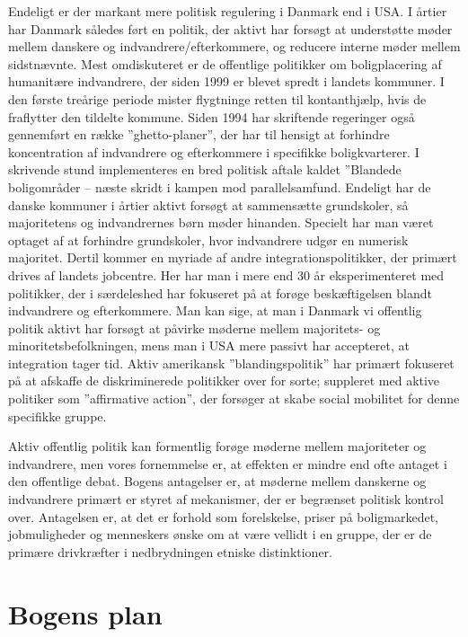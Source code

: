 \documentclass[
]{book}
\begin{document}
Endeligt er der markant mere politisk regulering i Danmark end i USA. I årtier har Danmark således ført en politik, der aktivt har forsøgt at understøtte møder mellem danskere og indvandrere/efterkommere, og reducere interne møder mellem sidstnævnte. Mest omdiskuteret er de offentlige politikker om boligplacering af humanitære indvandrere, der siden 1999 er blevet spredt i landets kommuner. I den første treårige periode mister flygtninge retten til kontanthjælp, hvis de fraflytter den tildelte kommune. Siden 1994 har skriftende regeringer også gennemført en række ''ghetto-planer'', der har til hensigt at forhindre koncentration af indvandrere og efterkommere i specifikke boligkvarterer. I skrivende stund implementeres en bred politisk aftale kaldet ''Blandede boligområder -- næste skridt i kampen mod parallelsamfund. Endeligt har de danske kommuner i årtier aktivt forsøgt at sammensætte grundskoler, så majoritetens og indvandrernes børn møder hinanden. Specielt har man været optaget af at forhindre grundskoler, hvor indvandrere udgør en numerisk majoritet. Dertil kommer en myriade af andre integrationspolitikker, der primært drives af landets jobcentre. Her har man i mere end 30 år eksperimenteret med politikker, der i særdeleshed har fokuseret på at forøge beskæftigelsen blandt indvandrere og efterkommere. Man kan sige, at man i Danmark vi offentlig politik aktivt har forsøgt at påvirke møderne mellem majoritets- og minoritetsbefolkningen, mens man i USA mere passivt har accepteret, at integration tager tid. Aktiv amerikansk ''blandingspolitik'' har primært fokuseret på at afskaffe de diskriminerede politikker over for sorte; suppleret med aktive politiker som ''affirmative action'', der forsøger at skabe social mobilitet for denne specifikke gruppe.

Aktiv offentlig politik kan formentlig forøge møderne mellem majoriteter og indvandrere, men vores fornemmelse er, at effekten er mindre end ofte antaget i den offentlige debat. Bogens antagelser er, at møderne mellem danskerne og indvandrere primært er styret af mekanismer, der er begrænset politisk kontrol over. Antagelsen er, at det er forhold som forelskelse, priser på boligmarkedet, jobmuligheder og menneskers ønske om at være vellidt i en gruppe, der er de primære drivkræfter i nedbrydningen etniske distinktioner.

\section{Bogens plan}\label{bogens-plan}
\end{document}
